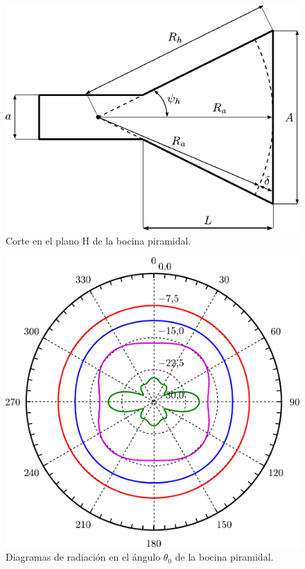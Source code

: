 \begin{figure}[H]
\centering
\includegraphics[scale = 1]{Figures/Estudio/estudio_36}
\caption{Corte en el plano H de la bocina piramidal.}
\label{fig_estudio:36}
\end{figure}
\begin{figure}[H]
\centering
\includegraphics[scale = 0.5]{Figures/Estudio/estudio_37}
\caption{Diagramas de radiación en el ángulo $\theta_0$ de la bocina piramidal.}
\label{fig_estudio:37}
\end{figure}
